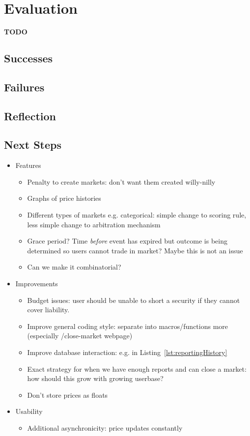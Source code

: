 \section{Evaluation}

\label{sec:evaluation}

\textbf{TODO}

\subsection{Successes}

\subsection{Failures}

\subsection{Reflection}

\subsection{Next Steps}

\begin{itemize}
	\item Features
		\begin{itemize}
			\item Penalty to create markets: don't want them created
				willy-nilly
			\item Graphs of price histories
			\item Different types of markets e.g. categorical: simple change to scoring
				rule, less simple change to arbitration mechanism
			\item Grace period? Time \emph{before} event has expired but
				outcome is being determined so users cannot trade in market?
				Maybe this is not an issue
			\item Can we make it combinatorial?
		\end{itemize}
	\item Improvements
		\begin{itemize}
			\item Budget issues: user should be unable to short a security if
				they cannot cover liability.
			\item Improve general coding style: separate into macros/functions more
				(especially /close-market webpage)
			\item Improve database interaction: e.g. in
				Listing~\ref{lst:reportingHistory}
			\item Exact strategy for when we have enough reports and can close a
				market: how should this grow with growing userbase?
			\item Don't store prices as floats
		\end{itemize}
	\item Usability
		\begin{itemize}
			\item Additional asynchronicity: price updates constantly
		\end{itemize}
\end{itemize}


